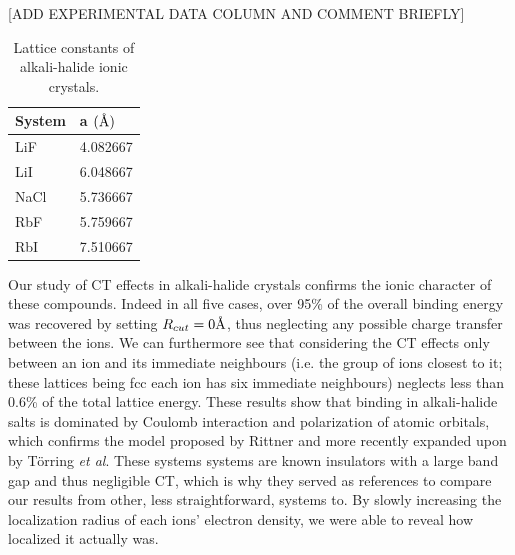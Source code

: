 \documentclass[aps,prb,twocolumn,amsmath,amssymb,superscriptaddress,longbibliography]{revtex4-1}
\newcommand{\angstrom}{\text{\normalfont\AA}}
\begin{document}
[ADD EXPERIMENTAL DATA COLUMN AND COMMENT BRIEFLY]
\begin{table}[]
\centering
\caption{Lattice constants of alkali-halide ionic crystals.}
\label{table:lattconsts}
\begin{tabular}{|l|l|}
\hline
System & a $(\angstrom)$ \\ \hline
LiF    & 4.082667        \\ \hline
LiI    & 6.048667        \\ \hline
NaCl   & 5.736667        \\ \hline
RbF    & 5.759667        \\ \hline
RbI    & 7.510667        \\ \hline
\end{tabular}
\end{table} 

Our study of CT effects in alkali-halide crystals confirms the ionic character of these compounds. 
Indeed in all five cases, over 95\% of the overall binding energy was recovered by setting $R_{cut} = 0\angstrom$, thus neglecting any possible charge transfer between the ions.
We can furthermore see that considering the CT effects only between an ion and its immediate neighbours (i.e. the group of ions closest to it; these lattices being fcc each ion has six immediate neighbours) neglects less than 0.6\% of the total lattice energy. 
These results show that binding in alkali-halide salts is dominated by Coulomb interaction and polarization of atomic orbitals, which confirms the model proposed by Rittner\cite{rittner} and more recently expanded upon by T\"{o}rring \emph{et al}\cite{torring}.
These systems systems are known insulators with a large band gap and thus negligible CT, which is why they served as references to compare our results from other, less straightforward, systems to.
By slowly increasing the localization radius of each ions' electron density, we were able to reveal how localized it actually was.
\end{document}
